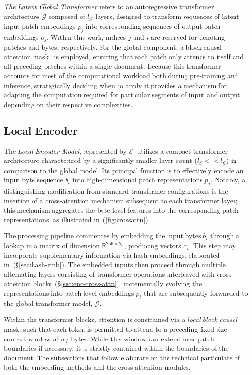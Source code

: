 \textit{The Latent Global Transformer} refers to an autoregressive transformer architecture $\mathcal{G}$ composed of $l_{\mathcal{G}}$ layers, designed to transform sequences of latent input patch embeddings $p_j$ into corresponding sequences of output patch embeddings $o_j$. Within this work, indices $j$ and $i$ are reserved for denoting patches and bytes, respectively. For the global component, a block-causal attention mask~\citep{dubey2024llama} is employed, ensuring that each patch only attends to itself and all preceding patches within a single document. Because this transformer accounts for most of the computational workload both during pre-training and inference, strategically deciding when to apply it provides a mechanism for adapting the computation required for particular segments of input and output depending on their respective complexities.

\subsection{Local Encoder}
\label{section:local}

The \textit{Local Encoder Model}, represented by $\mathcal{E}$, utilizes a compact transformer architecture characterized by a significantly smaller layer count ($l_{\mathcal{E}} << l_{\mathcal{G}}$) in comparison to the global model. Its principal function is to effectively encode an input byte sequence $b_i$ into high-dimensional patch representations $p_j$. Notably, a distinguishing modification from standard transformer configurations is the insertion of a cross-attention mechanism subsequent to each transformer layer; this mechanism aggregates the byte-level features into the corresponding patch representations, as illustrated in~(\autoref{fig:crossattn}).

The processing pipeline commences by embedding the input bytes $b_i$ through a lookup in a matrix of dimension $\mathbb{R}^{256 \times h_{\mathcal{E}}}$, producing vectors $x_i$. This step may incorporate supplementary information via hash-embeddings, elaborated in~(\S\ref{sec:hash-emb}). The embedded inputs then proceed through multiple alternating layers consisting of transformer operations interleaved with cross-attention blocks~(\S\ref{sec:enc-cross-attn}), incrementally evolving the representations into patch-level embeddings $p_i$ that are subsequently forwarded to the global transformer model, $\mathcal{G}$.

Within the transformer blocks, attention is constrained via a \textit{local block causal} mask, such that each token is permitted to attend to a preceding fixed-size context window of $w_{\mathcal{E}}$ bytes. While this window can extend over patch boundaries if necessary, it is strictly contained within the boundaries of the document. The subsections that follow elaborate on the technical particulars of both the embedding methods and the cross-attention modules.

